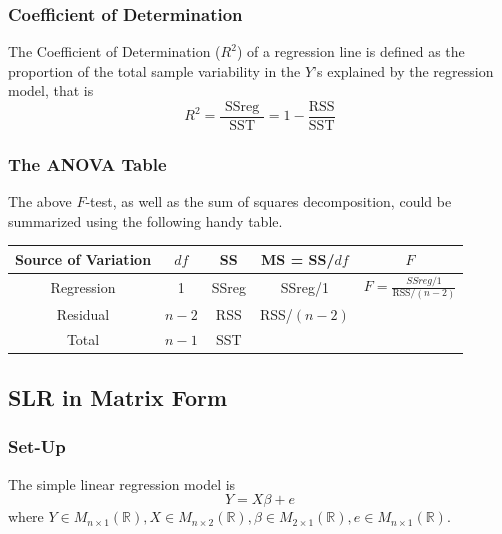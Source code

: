 \documentclass[11pt]{article}
\newcommand{\R}{\mathbb{R}}
\newcommand{\mat}[2]{M_{#1 \times #2}(\R)}
\begin{document}
\subsubsection{Coefficient of Determination}
The Coefficient of Determination ($R^2$) of a regression line is defined as the proportion of the total sample variability in the $Y$'s explained by the regression model, that is
\begin{equation*}
    R^{2}=\frac{\text { SSreg }}{\mathrm{SST}}=1-\frac{\mathrm{RSS}}{\mathrm{SST}}
\end{equation*}

\subsubsection{The ANOVA Table}
The above $F$-test, as well as the sum of squares decomposition, could be summarized using the following handy table. 
\begin{center}
    \begin{tabular}{|c||c|c|c|c|}
        \hline
        Source of Variation & $df$    & SS    & MS = SS/$df$& $F$                                      \\ \hline \hline
        Regression          & 1     & SSreg & SSreg/1     & $F = \frac{SSreg/1}{\text{RSS}/(n-2)}$ \\ \hline
        Residual            & $n-2$ & RSS   & RSS/$(n-2)$ &                                        \\ \hline
        Total               & $n-1$ & SST   &             &                                        \\ \hline
    \end{tabular}
\end{center}

\subsection{SLR in Matrix Form}
\subsubsection{Set-Up}
The simple linear regression model is
\begin{equation*}
    Y = X\beta + e
\end{equation*}
where $Y \in \mat{n}{1}, X\in \mat{n}{2}, \beta\in \mat{2}{1}, e\in \mat{n}{1}$.
\end{document}

